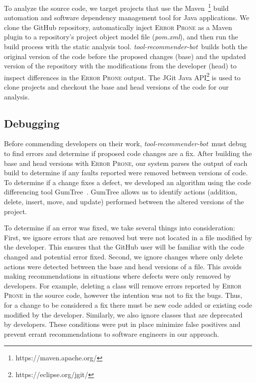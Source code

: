 \documentclass[sigconf,review,anonymous]{acmart}
\newcommand{\tool}{\textsl{tool-recommender-bot}}
\begin{document}
To analyze the source code, we target projects that use the Maven~\footnote{https://maven.apache.org/} build automation and software dependency management tool for Java applications. We clone the GitHub repository, automatically inject \textsc{Error Prone} as a Maven plugin to a repository's project object model file (\textit{pom.xml}), and then run the build process with the static analysis tool. \tool~builds both the original version of the code before the proposed changes (base) and the updated version of the repository with the modifications from the developer (head) to inspect differences in the \textsc{Error Prone} output. The JGit Java API\footnote{https://eclipse.org/jgit/} is used to clone projects and checkout the base and head versions of the code for our analysis.

\subsection{Debugging}

Before commending developers on their work, \tool~must debug to find errors and determine if proposed code changes are a fix. After building the base and head versions with \textsc{Error Prone}, our system parses the output of each build to determine if any faults reported were removed between versions of code. To determine if a change fixes a defect, we developed an algorithm using the code differencing tool GumTree~\cite{GumTree}. GumTree allows us to identify actions (addition, delete, insert, move, and update) performed between the altered versions of the project. 

To determine if an error was fixed, we take several things into consideration: First, we ignore errors that are removed but were not located in a file modified by the developer. This ensures that the GitHub user will be familiar with the code changed and potential error fixed. Second, we ignore changes where only delete actions were detected between the base and head versions of a file. This avoids making recommendations in situations where defects were only removed by developers. For example, deleting a class will remove errors reported by \textsc{Error Prone} in the source code, however the intention was not to fix the bugs. Thus, for a change to be considered a fix there must be new code added or existing code modified by the developer. Similarly, we also ignore classes that are deprecated by developers. These conditions were put in place minimize false positives and prevent errant recommendations to software engineers in our approach.
\end{document}
